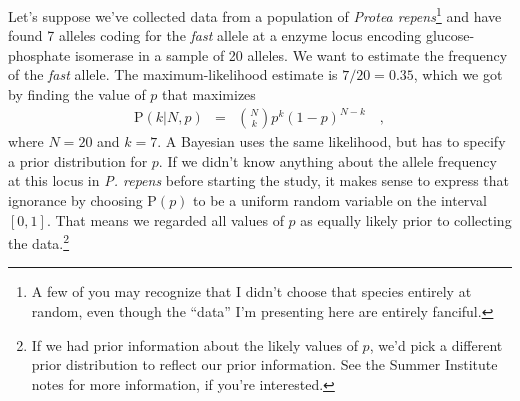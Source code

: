 \documentclass[12pt]{article}
\begin{document}
Let's suppose we've collected data from a population of {\it Protea
  repens}\footnote{A few of you may recognize that I didn't choose
  that species entirely at random, even though the ``data'' I'm
  presenting here are entirely fanciful.} and have found 7 alleles
coding for the {\it fast\/} allele at a enzyme locus encoding
glucose-phosphate isomerase in a sample of 20 alleles. We want to
estimate the frequency of the {\it fast\/} allele. The
maximum-likelihood estimate is $7/20 = 0.35$, which we got by finding
the value of $p$ that maximizes
\begin{eqnarray*}
\mbox{P}(k|N,p) &=& {N \choose k} p^k (1-p)^{N-k} \quad ,
\end{eqnarray*}
where $N=20$ and $k=7$. A Bayesian uses the same likelihood, but has
to specify a prior distribution for $p$. If we didn't know anything
about the allele frequency at this locus in {\it P. repens} before
starting the study, it makes sense to express that ignorance by
choosing $\mbox{P}(p)$ to be a uniform random variable on the interval
$[0,1]$. That means we regarded all values of $p$ as equally likely
prior to collecting the data.\footnote{If we had prior information
  about the likely values of $p$, we'd pick a different prior
  distribution to reflect our prior information. See the Summer
  Institute notes for more information, if you're interested.}
\end{document}
